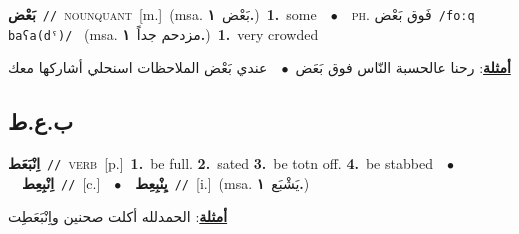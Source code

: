 \documentclass[10pt,a4paper,twoside]{article} %
\begin{document}
\begin{multicols}{2}
{\setlength\topsep{0pt}\textbf{\foreignlanguage{arabic}{بَعْض}}\ {\color{gray}\texttt{//}\color{black}}\ \textsc{noun\textunderscore quant}\ [m.]\ \color{gray}(msa. \foreignlanguage{arabic}{بَعْض}~\foreignlanguage{arabic}{\textbf{١.}})\color{black}\ \textbf{1.}~some\ \ $\bullet$\ \ \textsc{ph.} \color{gray} \foreignlanguage{arabic}{فَوق بَعْض}\color{black}\ {\color{gray}\texttt{/{\sffamily foːq baʕa(dˤ)}/}\color{black}}\ \color{gray} (msa. \foreignlanguage{arabic}{مزدحم جداً}~\foreignlanguage{arabic}{\textbf{١.}})\color{black}\ \textbf{1.}~very crowded\  \begin{flushright}\color{gray}\foreignlanguage{arabic}{\textbf{\underline{\foreignlanguage{arabic}{أمثلة}}}: رحنا عالحسبة النّاس فوق بَعَض\ $\bullet$\ \  عندي بَعْض الملاحظات اسنحلي أشاركها معك}\end{flushright}\color{black}} \vspace{2mm}

\vspace{-3mm}
\subsection*{\color{blue}\foreignlanguage{arabic}{ب.ع.ط}\color{blue}{}} 

{\setlength\topsep{0pt}\textbf{\foreignlanguage{arabic}{اِنْبَعَط}}\ {\color{gray}\texttt{//}\color{black}}\ \textsc{verb}\ [p.]\ \textbf{1.}~be full.  \textbf{2.}~sated  \textbf{3.}~be totn off.  \textbf{4.}~be stabbed\ \ $\bullet$\ \ \setlength\topsep{0pt}\textbf{\foreignlanguage{arabic}{اِنْبِعِط}}\ {\color{gray}\texttt{//}\color{black}}\ [c.]\ \ $\bullet$\ \ \setlength\topsep{0pt}\textbf{\foreignlanguage{arabic}{يِنْبِعِط}}\ {\color{gray}\texttt{//}\color{black}}\ [i.]\ \color{gray}(msa. \foreignlanguage{arabic}{يَشْبَع}~\foreignlanguage{arabic}{\textbf{١.}})\color{black}\  \begin{flushright}\color{gray}\foreignlanguage{arabic}{\textbf{\underline{\foreignlanguage{arabic}{أمثلة}}}: الحمدلله أكلت صحنين واِنْبَعَطِت}\end{flushright}\color{black}} \vspace{2mm}


\end{multicols}
\end{document}
